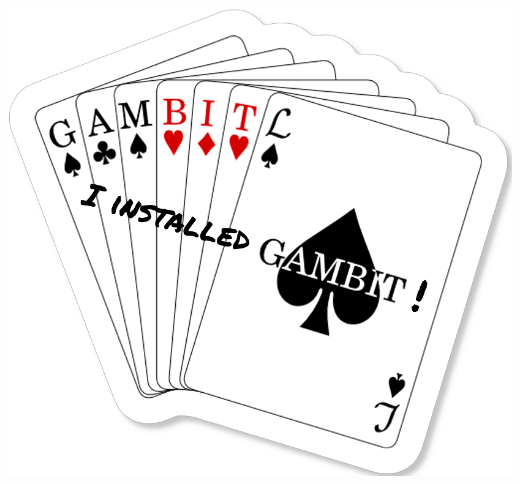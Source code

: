 \documentclass[aspectratio=169]{beamer}
\begin{document}
\begin{frame}
\begin{columns}
        \includegraphics[width=\textwidth]{figures/gambit_sticker}
    \end{columns}

\end{frame}
\end{document}
